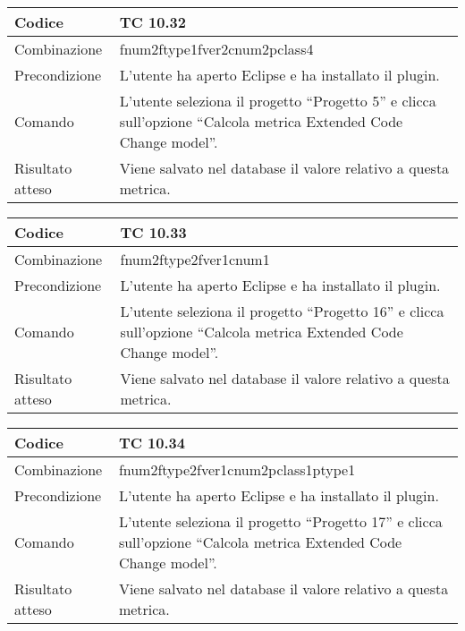 \begin{table}[ht]
\begin{tabular}{|p{3cm}|p{9cm}|}
\hline
\cellcolor{lightgray}Codice				& TC 10.32								\\
\hline
\cellcolor{lightgray}Combinazione		& fnum2ftype1fver2cnum2pclass4									\\
\hline
\cellcolor{lightgray}Precondizione		& L'utente ha aperto Eclipse e ha installato il plugin.		\\
\hline
\cellcolor{lightgray}Comando			& L'utente seleziona il progetto ``Progetto 5''  e clicca sull'opzione ``Calcola metrica Extended Code Change model''.	\\
\hline
\cellcolor{lightgray}Risultato atteso	& Viene salvato nel database il valore relativo a questa metrica.\\
\hline
\end{tabular}
\end{table}

\begin{table}[ht]
\begin{tabular}{|p{3cm}|p{9cm}|}
\hline
\cellcolor{lightgray}Codice				& TC 10.33								\\
\hline
\cellcolor{lightgray}Combinazione		& fnum2ftype2fver1cnum1									\\
\hline
\cellcolor{lightgray}Precondizione		& L'utente ha aperto Eclipse e ha installato il plugin.		\\
\hline
\cellcolor{lightgray}Comando			& L'utente seleziona il progetto ``Progetto 16''  e clicca sull'opzione ``Calcola metrica Extended Code Change model''.	\\
\hline
\cellcolor{lightgray}Risultato atteso	& Viene salvato nel database il valore relativo a questa metrica.\\
\hline
\end{tabular}
\end{table}

\clearpage

\begin{table}[ht]
\begin{tabular}{|p{3cm}|p{9cm}|}
\hline
\cellcolor{lightgray}Codice				& TC 10.34								\\
\hline
\cellcolor{lightgray}Combinazione		& fnum2ftype2fver1cnum2pclass1ptype1									\\
\hline
\cellcolor{lightgray}Precondizione		& L'utente ha aperto Eclipse e ha installato il plugin.		\\
\hline
\cellcolor{lightgray}Comando			& L'utente seleziona il progetto ``Progetto 17''  e clicca sull'opzione ``Calcola metrica Extended Code Change model''.	\\
\hline
\cellcolor{lightgray}Risultato atteso	& Viene salvato nel database il valore relativo a questa metrica.\\
\hline
\end{tabular}
\end{table}

